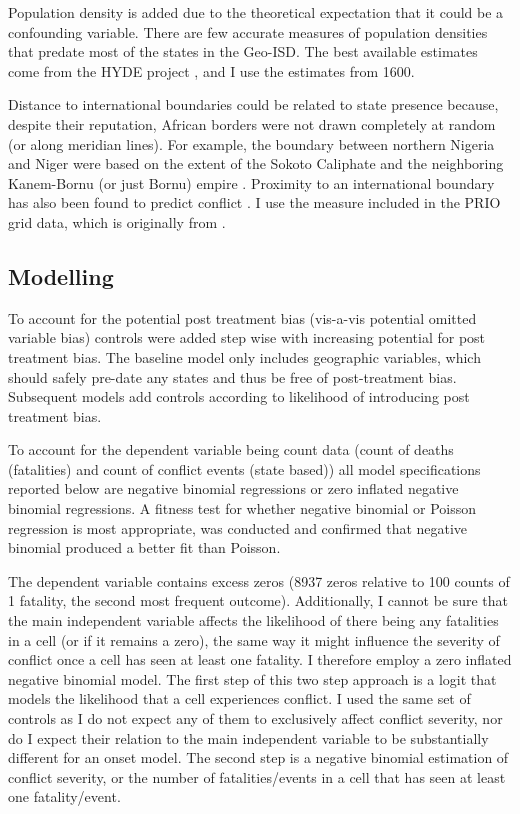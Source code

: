 \documentclass[12pt]{article}
\begin{document}
Population density is added due to the theoretical expectation that it could be
a confounding variable. There are few accurate measures of population densities
that predate most of the states in the Geo-ISD. The best available estimates
come from the HYDE project \citep{Goldewijk2016}, and I use the estimates from
1600.

Distance to international boundaries could be related to state presence because,
despite their reputation, African borders were not drawn completely at random
(or along meridian lines). For example, the boundary between northern Nigeria and
Niger were based on the extent of the Sokoto Caliphate and the neighboring
Kanem-Bornu (or just Bornu) empire \citep{HiribarrenVincent2017AHoB}. Proximity
to an international boundary has also been found to predict conflict
\citep{Buhaug2002}. I use the measure included in the PRIO grid data, which is
originally from \citet{Weidmann2010a}.


\subsection{Modelling} \label{Modelling}

To account for the potential post treatment bias (vis-a-vis potential omitted
variable bias) controls were added step wise with increasing potential for post
treatment bias. The baseline model only includes geographic variables, which
should safely pre-date any states and thus be free of post-treatment bias.
Subsequent models add controls according to likelihood of introducing post
treatment bias.

To account for the dependent variable being count data (count of deaths
(fatalities) and count of conflict events (state based)) all model
specifications reported below are negative binomial regressions or zero inflated
negative binomial regressions. A fitness test for whether negative binomial or
Poisson regression is most appropriate, was conducted and confirmed that
negative binomial produced a better fit than Poisson.

The dependent variable contains excess zeros (8937 zeros relative to 100 counts
of 1 fatality, the second most frequent outcome). Additionally, I cannot be sure
that the main independent variable affects the likelihood of there being any
fatalities in a cell (or if it remains a zero), the same way it might influence
the severity of conflict once a cell has seen at least one fatality. I therefore
employ a zero inflated negative binomial model. The first step of this two step
approach is a logit that models the likelihood that a cell experiences conflict.
I used the same set of controls as I do not expect any of them to exclusively
affect conflict severity, nor do I expect their relation to the main independent
variable to be substantially different for an onset model. The second step is a
negative binomial estimation of conflict severity, or the number of
fatalities/events in a cell that has seen at least one fatality/event.
\end{document}
